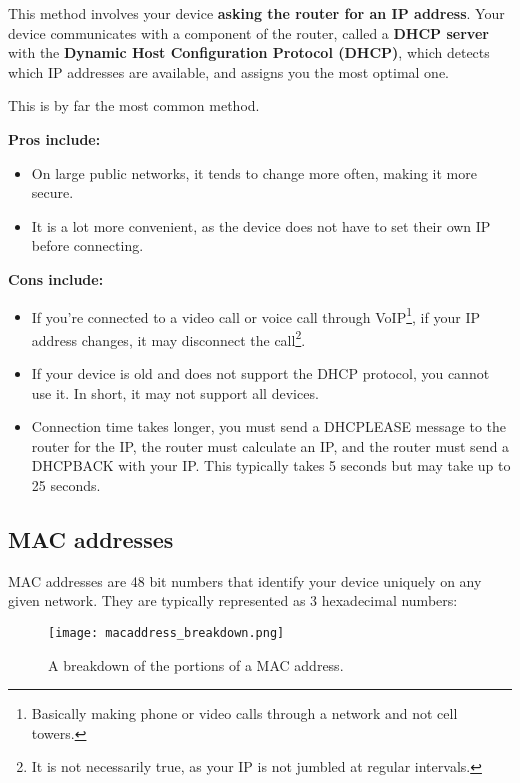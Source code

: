 \documentclass[../main.tex]{subfiles}
\begin{document}

This method involves your device \textbf{asking the router for an IP address}. Your device communicates with a component of the router, called a \textbf{DHCP server} with the \textbf{Dynamic Host Configuration Protocol (DHCP)}, which detects which IP addresses are available, and assigns you the most optimal one.

This is by far the most common method.

\textbf{Pros include:}
\begin{itemize}
    \item On large public networks, it tends to change more often, making it more secure.
    \item It is a lot more convenient, as the device does not have to set their own IP before connecting.
\end{itemize}

\textbf{Cons include:}
\begin{itemize}
    \item If you're connected to a video call or voice call through VoIP\footnote{Basically making phone or video calls through a network and not cell towers.}, if your IP address changes, it may disconnect the call\footnote{It is not necessarily true, as your IP is not jumbled at regular intervals.}.
    \item If your device is old and does not support the DHCP protocol, you cannot use it. In short, it may not support all devices.
    \item Connection time takes longer, you must send a {\ccmono DHCPLEASE} message to the router for the IP, the router must calculate an IP, and the router must send a {\ccmono DHCPBACK} with your IP. This typically takes 5 seconds but may take up to 25 seconds.
\end{itemize}

\subsection{MAC addresses}
\label{2:sec:mac}

MAC addresses are 48 bit numbers that identify your device uniquely on any given network. They are typically represented as 3 hexadecimal numbers:

\begin{figure}[ht]
    \centering
    \texttt{[image: macaddress\_breakdown.png]}
    \caption{A breakdown of the portions of a MAC address.}
    \label{fig:macaddress_breakdown}
\end{figure}
\end{document}
